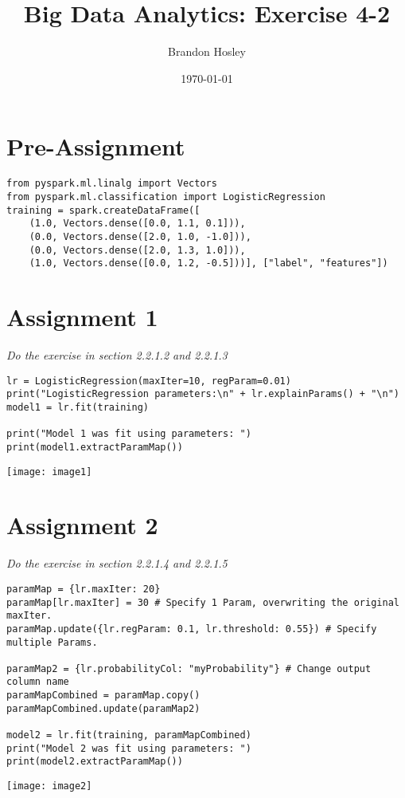 \documentclass[]{article}
\title{Big Data Analytics: Exercise 4-2}
\author{Brandon Hosley}
\date{\today}
\begin{document}
\maketitle

\section*{Pre-Assignment}
\begin{verbatim}
from pyspark.ml.linalg import Vectors
from pyspark.ml.classification import LogisticRegression
training = spark.createDataFrame([
	(1.0, Vectors.dense([0.0, 1.1, 0.1])),
	(0.0, Vectors.dense([2.0, 1.0, -1.0])),
	(0.0, Vectors.dense([2.0, 1.3, 1.0])),
	(1.0, Vectors.dense([0.0, 1.2, -0.5]))], ["label", "features"])
\end{verbatim}

\section*{Assignment 1}
\emph{ Do the exercise in section 2.2.1.2 and 2.2.1.3 }

\begin{verbatim}
lr = LogisticRegression(maxIter=10, regParam=0.01)
print("LogisticRegression parameters:\n" + lr.explainParams() + "\n")
model1 = lr.fit(training)

print("Model 1 was fit using parameters: ")
print(model1.extractParamMap())
\end{verbatim}
\texttt{[image: image1]} %


\section*{Assignment 2}
\emph{ Do the exercise in section 2.2.1.4 and 2.2.1.5 }

\begin{verbatim}
paramMap = {lr.maxIter: 20}
paramMap[lr.maxIter] = 30 # Specify 1 Param, overwriting the original maxIter.
paramMap.update({lr.regParam: 0.1, lr.threshold: 0.55}) # Specify multiple Params.

paramMap2 = {lr.probabilityCol: "myProbability"} # Change output column name
paramMapCombined = paramMap.copy()
paramMapCombined.update(paramMap2)

model2 = lr.fit(training, paramMapCombined)
print("Model 2 was fit using parameters: ")
print(model2.extractParamMap())
\end{verbatim}
\texttt{[image: image2]} %
\end{document}
